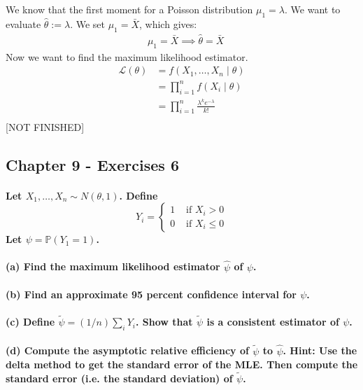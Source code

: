 \documentclass{article}
\renewcommand{\L}{\mathcal{L}}
\begin{document}
We know that the first moment for a Poisson distribution $\mu_1 = \lambda$. We want to evaluate \(\hat\theta := \lambda\).
We set \(\mu_1 = \bar{X}\), which gives:
\begin{align*}
     & \mu_1 = \bar{X}
    \implies
    \hat \theta = \bar{X}
\end{align*}
Now we want to find the maximum likelihood estimator.
\begin{align*}
    \L(\theta)
     & = f(X_1, \ldots, X_n \mid \theta)                 \\
     & = \prod_{i=1}^n f(X_i\mid \theta)                 \\
     & = \prod_{i=1}^n \frac{\lambda^k e^{-\lambda}}{k!} \\
\end{align*}
[NOT FINISHED]

\subsection{Chapter 9 - Exercises 6}
\paragraph{Let $X_{1}, \ldots, X_{n} \sim N(\theta, 1)$. Define
    $$
        Y_{i}=\left\{\begin{array}{ll}
            1 & \text { if } X_{i}>0      \\
            0 & \text { if } X_{i} \leq 0
        \end{array}\right.
    $$
    Let $\psi=\mathbb{P}\left(Y_{1}=1\right)$.}
\paragraph{(a) Find the maximum likelihood estimator $\widehat{\psi}$ of $\psi$.}
\paragraph{(b) Find an approximate 95 percent confidence interval for $\psi$.}
\paragraph{(c) Define $\widetilde{\psi}=(1 / n) \sum_{i} Y_{i}$. Show that $\widetilde{\psi}$ is a consistent estimator of $\psi$.}
\paragraph{(d) Compute the asymptotic relative efficiency of $\widetilde{\psi}$ to $\widehat{\psi}$. Hint: Use the delta method to get the standard error of the MLE. Then compute the standard error (i.e. the standard deviation) of $\widetilde{\psi}$.}
\end{document}
